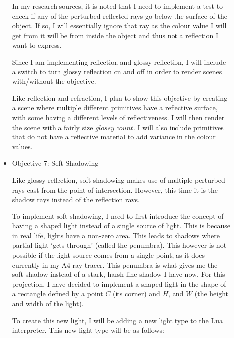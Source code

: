 \documentclass {article}
\begin{document}
\begin{description}
\begin{itemize}
	 In my research sources, it is noted that I need to implement a test to check if any of the perturbed reflected rays go below the surface of the object. If so, I will essentially ignore that ray as the colour value I will get from it will be from inside the object and thus not a reflection I want to express. \newline
	
	\cite{lectures_general} \cite{shirley} \newline
	
	 Since I am implementing reflection and glossy reflection, I will include a switch to turn glossy reflection on and off in order to render scenes with/without the objective. \newline
	
	 Like reflection and refraction, I plan to show this objective by creating a scene where multiple different primitives have a reflective surface, with some having a different levels of reflectiveness. I will then render the scene with a fairly size $glossy\_count$. I will also include primitives that do not have a reflective material to add variance in the colour values. \newline
    	  
    	 \item Objective 7: Soft Shadowing \newline
    	 
	 Like glossy reflection, soft shadowing makes use of multiple perturbed rays cast from the point of intersection. However, this time it is the shadow rays instead of the reflection rays. \newline
	
	 To implement soft shadowing, I need to first introduce the concept of having a shaped light instead of a single source of light. This is because in real life, lights have a non-zero area. This leads to shadows where partial light `gets through' (called the penumbra). This however is not possible if the light source comes from a single point, as it does currently in my A4 ray tracer. This penumbra is what gives me the soft shadow instead of a stark, harsh line shadow I have now. For this projection, I have decided to implement a shaped light in the shape of a rectangle defined by a point $C$ (its corner) and $H$, and $W$ (the height and width of the light). \newline
	
	 To create this new light, I will be adding a new light type to the Lua interpreter. This new light type will be as follows: \newline
	

\end{itemize}
\end{description}
\end{document}
